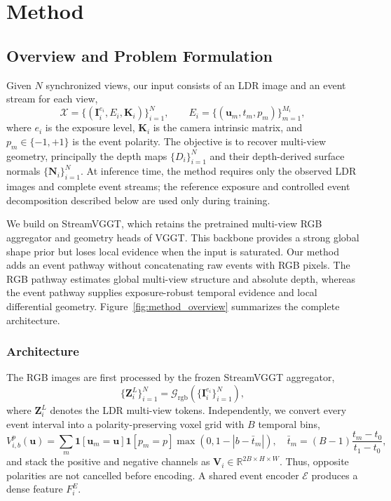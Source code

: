 
\section{Method}
\label{sec:method_revised}

\subsection{Overview and Problem Formulation}
\label{sec:overview_problem}

Given $N$ synchronized views, our input consists of an LDR image and an
event stream for each view,
\begin{equation}
    \mathcal{X}=\{(\bm I_i^{e_i},E_i,\bm K_i)\}_{i=1}^{N},
    \qquad
    E_i=\{(\bm u_m,t_m,p_m)\}_{m=1}^{M_i},
\end{equation}
where $e_i$ is the exposure level, $\bm K_i$ is the camera intrinsic matrix,
and $p_m\in\{-1,+1\}$ is the event polarity. The objective is to recover
multi-view geometry, principally the depth maps $\{D_i\}_{i=1}^{N}$ and their
depth-derived surface normals $\{\bm N_i\}_{i=1}^{N}$. At inference time, the
method requires only the observed LDR images and complete event streams; the
reference exposure and controlled event decomposition described below are
used only during training.

We build on StreamVGGT, which retains the pretrained multi-view RGB
aggregator and geometry heads of VGGT. This backbone provides a strong global
shape prior but loses local evidence when the input is saturated. Our method
adds an event pathway without concatenating raw events with RGB pixels. The
RGB pathway estimates global multi-view structure and absolute depth, whereas
the event pathway supplies exposure-robust temporal evidence and local
differential geometry. Figure~\ref{fig:method_overview} summarizes the complete
architecture.

\subsubsection{Architecture}
\label{sec:architecture}

The RGB images are first processed by the frozen StreamVGGT aggregator,
\begin{equation}
    \{\bm Z_i^{L}\}_{i=1}^{N}
    =\mathcal G_{\mathrm{rgb}}(\{\bm I_i^{e_i}\}_{i=1}^{N}),
\end{equation}
where $\bm Z_i^{L}$ denotes the LDR multi-view tokens. Independently, we
convert every event interval into a polarity-preserving voxel grid with $B$
temporal bins,
\begin{equation}
 V_{i,b}^{p}(\bm u)=
 \sum_m \mathbf 1[\bm u_m=\bm u]\mathbf 1[p_m=p]
 \max(0,1-|b-\bar t_m|),
 \quad
 \bar t_m=(B-1)\frac{t_m-t_0}{t_1-t_0},
\end{equation}
and stack the positive and negative channels as
$\bm V_i\in\mathbb R^{2B\times H\times W}$. Thus, opposite polarities are not
cancelled before encoding. A shared event encoder $\mathcal E$ produces a
dense feature $F_i^E$.


